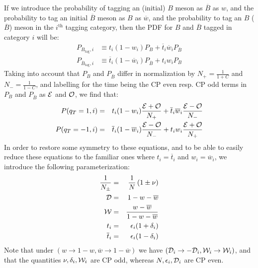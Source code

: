 \documentclass[a4paper,9pt,twoside]{article}
\begin{document}
If we introduce the probability of tagging an (initial) $B$ meson as $\overline{B}$ as $w$, and
the probability to tag an initial $\overline{B}$ meson as $B$ as $\overline{w}$, and the probability
to tag an $B$ ($\overline{B}$) meson in the $i^\mathrm{th}$ tagging category, then the
PDF for $B$ and $\overline{B}$ tagged in category $i$ will be:
\begin{eqnarray}
   P_{B_\mathrm{tag},i} &\equiv t_i (1-w_i) P_{B} + \overline{t}_i\overline{w}_i P_{\overline{ B} }\\
   P_{\overline{B}_\mathrm{tag},i} &\equiv \overline{t}_i (1-\overline{w}_i) P_{\overline{B}} + t_i w_i P_{ B }
\end{eqnarray} 
Taking into account that $P_{B}$ and $P_{\overline{B}}$ differ in normalization by
$N_+=\frac{1}{1+C}$ and $N_-=\frac{1}{1-C}$, and labelling for the time being the CP even 
resp. CP odd terms in $P_{B}$ and $P_{\overline{B}}$ as ${\cal E}$
and ${\cal O}$, we find that:
\begin{eqnarray}
   P(q_T=1,i) &=& t_i(1-w_i)\frac{{\cal E} + {\cal O}}{N_+} + \overline{t}_i\overline{w}_i\frac{{\cal E}-{\cal O}}{N_-}  \\
   P(q_T=-1,i) &=& \overline{t}_i(1-\overline{w}_i)\frac{{\cal E} - {\cal O}}{N_-} + t_i w_i\frac{{\cal E}+{\cal O}}{N_+} 
\end{eqnarray} 
In order to restore some symmetry to these equations, and to be able to easily reduce these
equations to the familiar ones where $t_i=\overline{t}_i$ and $w_i=\overline{w}_i$, we introduce 
the following parameterization:
\begin{eqnarray}
\frac{1}{N_\pm} &=& \frac{1}{N}\left( 1 \pm \nu \right) \\
 {\cal D} &=&1-w - \overline{w} \\
 {\cal W} &=& \frac{ w - \overline{w}}{1-w-\overline{w}}\\
t_i &=& \epsilon_i(1+\delta_i)\\
\overline{t}_i &=& \epsilon_i(1-\delta_i)
\end{eqnarray}
Note that under $(w\rightarrow 1-w, \overline{w}\rightarrow 1-\overline{w})$ we have $({\cal D}_i \rightarrow -{\cal D}_i,{\cal W}_i\rightarrow{\cal W}_i)$,
and that the quantities $\nu,\delta_i,{\cal W}_i$ are CP odd, whereas $N,\epsilon_i,{\cal D}_i$ are CP even.
\end{document}
